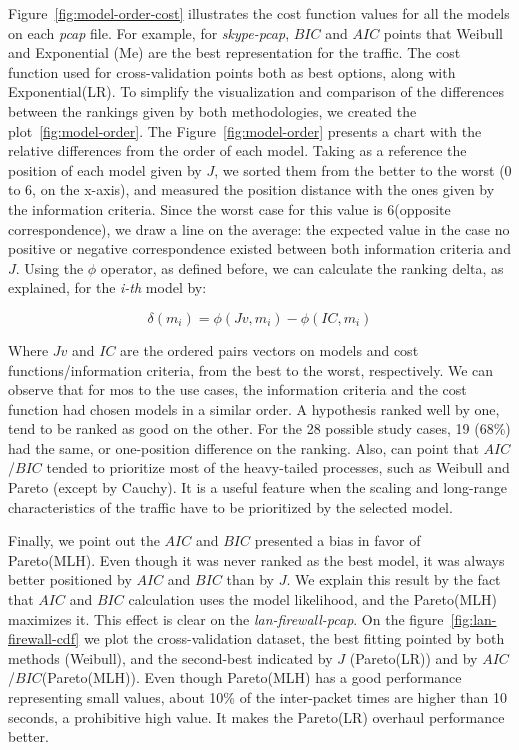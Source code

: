 Figure~\ref{fig:model-order-cost} illustrates the cost function values for all the models on each \textit{pcap} file. For example, for \textit{skype-pcap}, $BIC$ and $AIC$ points that  Weibull and Exponential (Me) are the best representation for the traffic. The cost function used for cross-validation points both as best options, along with Exponential(LR).  To simplify the visualization and comparison of the differences between the rankings given by both methodologies, we created the plot~\ref{fig:model-order}.
The Figure~\ref{fig:model-order} presents a chart with the relative differences from the order of each model. Taking as a reference the position of each model given by $J$, we sorted them from the better to the worst (0 to 6, on the x-axis), and measured the position distance with the ones given by the information criteria. Since the worst case for this value is 6(opposite correspondence), we draw a line on the average: the expected value in the case no positive or negative correspondence existed between both information criteria and $J$. Using the $\phi$ operator, as defined before, we can calculate the ranking delta, as explained, for the \textit{i-th} model by:

\begin{equation}
\delta(m_i) = \phi(Jv, m_i) - \phi(IC, m_i)
\end{equation}

Where $Jv$ and $IC$ are the ordered pairs vectors on models and cost functions/information criteria, from the best to the worst, respectively.  We can observe that for mos to the use cases, the information criteria and the cost function had chosen models in a similar order. A hypothesis ranked well by one, tend to be ranked as good on the other. For the 28 possible study cases, 19 (68\%) had the same, or one-position difference on the ranking. 
Also, can point that $AIC$/$BIC$ tended to prioritize most of the heavy-tailed processes, such as Weibull and Pareto (except by Cauchy). It is a useful feature when the scaling and long-range characteristics of the traffic have to be prioritized by the selected model. 

Finally, we point out the $AIC$ and $BIC$ presented a bias in favor of Pareto(MLH). Even though it was never ranked as the best model, it was always better positioned by $AIC$ and $BIC$ than by $J$. We explain this result by the fact that $AIC$ and $BIC$ calculation uses the model likelihood, and the  Pareto(MLH) maximizes it.  This effect is clear on the \textit{lan-firewall-pcap}. On the figure~\ref{fig:lan-firewall-cdf} we plot the cross-validation dataset, the best fitting pointed by both methods (Weibull), and the second-best indicated by $J$ (Pareto(LR)) and by $AIC$/$BIC$(Pareto(MLH)). Even though Pareto(MLH) has a good performance representing small values, about 10\% of the inter-packet times are higher than 10 seconds, a prohibitive high value. It makes the Pareto(LR) overhaul performance better.


